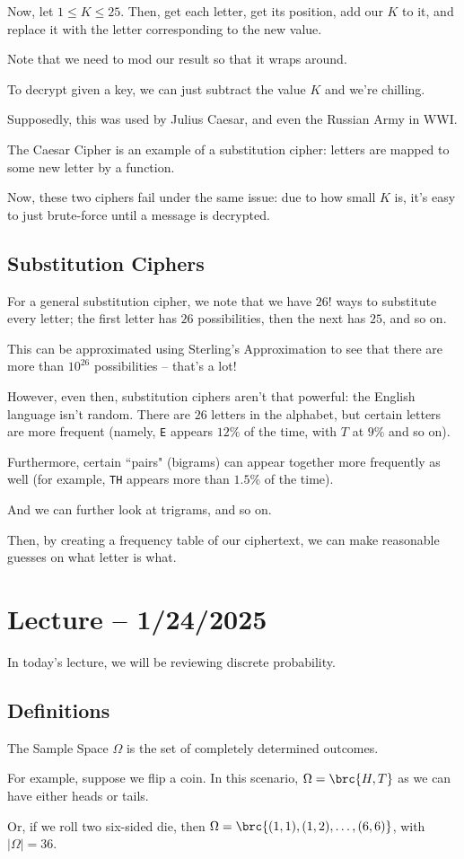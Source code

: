 \documentclass[openany]{book}
\begin{document}
Now, let $1 \leq K \leq 25$. Then, get each letter, get its position, add our $K$ to it, and replace it with the letter corresponding to the new value.

Note that we need to mod our result so that it wraps around.

To decrypt given a key, we can just subtract the value $K$ and we're chilling.

Supposedly, this was used by Julius Caesar, and even the Russian Army in WWI.

The Caesar Cipher is an example of a substitution cipher: letters are mapped to some new letter by a function.

Now, these two ciphers fail under the same issue: due to how small $K$ is, it's easy to just brute-force until a message is decrypted.

\subsection{Substitution Ciphers}
For a general substitution cipher, we note that we have $26!$ ways to substitute every letter; the first letter has $26$ possibilities, then the next has $25$, and so on.

This can be approximated using Sterling's Approximation to see that there are more than $10^{26}$ possibilities -- that's a lot!

However, even then, substitution ciphers aren't that powerful: the English language isn't random. There are $26$ letters in the alphabet, but certain letters are more frequent (namely, \texttt{E} appears $12\%$ of the time, with $T$ at $9\%$ and so on).

Furthermore, certain ``pairs" (bigrams) can appear together more frequently as well (for example, \texttt{TH} appears more than $1.5\%$ of the time).

And we can further look at trigrams, and so on.

Then, by creating a frequency table of our ciphertext, we can make reasonable guesses on what letter is what.

\section{Lecture -- 1/24/2025}
In today's lecture, we will be reviewing discrete probability.

\subsection{Definitions}
\begin{defn}
	The Sample Space $\Omega$ is the set of completely determined outcomes.
\end{defn}
\begin{example}
	For example, suppose we flip a coin. In this scenario, $\Omega = \brc{H, T}$ as we can have either heads or tails.
	
	Or, if we roll two six-sided die, then $\Omega = \brc{(1, 1), (1,2) ,\ldots, (6,6)}$, with $\lvert \Omega \rvert = 36$.
\end{example}
\end{document}
